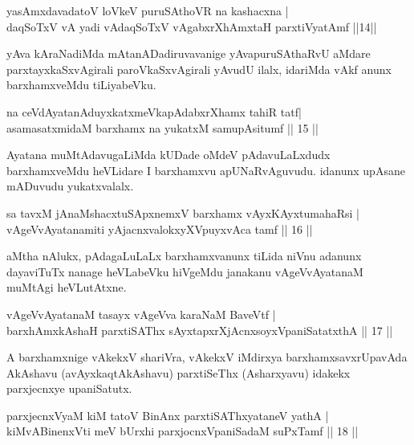 \begin{shl}
yasAmxdavadatoV loVkeV puruSAthoVR na kashacxna |\\
daqSoTxV vA yadi vA\s daqSoTxV vAgabxrXhAmxtaH parxtiVyatAmf \hfill ||14|| 
\end{shl}

\begin{artha}
yAva kAraNadiMda mAtanADadiruvavanige yAva\break puruSAthaRvU aMdare parxtayxkaSxvAgirali paroVkaSxvAgirali yAvudU ilalx, idariMda vAkf anunx barxhamxveMdu tiLiyabeVku.
\end{artha}

\begin{shl}
na ceVdAyatanAduyxkatxmeVkapAdabxrXhamx tahiR tatf|\\
asamasatxmidaM barxhamx na yukatxM samupAsitumf \hfill || 15 ||
\end{shl}

\begin{artha}
Ayatana muMtAdavugaLiMda kUDade oMdeV pAdavuLaLxdudx barxhamxveMdu heVLidare I barxhamxvu apUNaRvAguvudu. idanunx upAsane mADuvudu yukatxvalalx.
\end{artha}

\begin{shl}
sa tavxM jAnaMshacxtuSApxnemxV barxhamx vAyxKAyxtumahaRsi |\\
vAgeVvA\s \s yatanamiti yAjacnxvalokxyXV\s puyxvAca tamf \hfill || 16 || 
\end{shl}

\begin{artha}
aMtha nAlukx, pAdagaLuLaLx barxhamxvanunx tiLida niVnu adanunx dayaviTuTx nanage heVLabeVku \mdash hiVgeMdu janakanu vAgeVvAyatanaM muMtAgi heVLutAtxne.
\end{artha}

\begin{shl}
vAgeVvA\s \s yatanaM tasayx vAgeVva karaNaM BaveVtf |\\
barxhAmx\s \s kAshaH parxtiSAThx sAyxtapxrXjAcnx\s soyxVpaniSatatxthA \hfill || 17 || 
\end{shl}

\begin{artha}
A barxhamxnige vAkekxV shariVra, vAkekxV iMdirxya barxhamxsavxrUpavAda AkAshavu (avAyxkaqtAkAshavu) parxtiSeThx (Asharxyavu) idakekx parxjecnxye upaniSatutx.
\end{artha}


\begin{shl}
parxjecnxVyaM kiM tatoV BinAnx parxtiSAThxyataneV yathA |\\
kiMvA\s BinenxVti meV bUrxhi parxjocnxVpaniSadaM suPxTamf \hfill || 18 || 
\end{shl}

